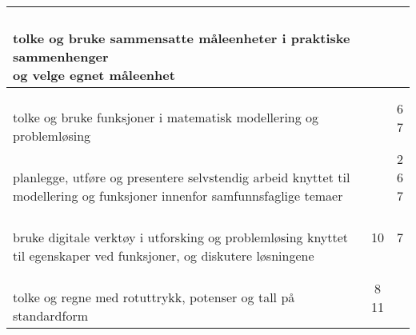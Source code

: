 \documentclass{article}
\begin{document}
\begin{center}
\begin{tabular}{p{10.5cm} | c | c |}
		\shortstack[l]{\\ tolke og bruke sammensatte måleenheter i praktiske sammenhenger\\ og velge egnet måleenhet
		} &\shortstack{} &\shortstack{1} \\ \hline
		
		\shortstack[l]{\\ tolke og bruke funksjoner i matematisk modellering og problemløsing \\\phantom{text}
		} &\shortstack{} &\shortstack{6\\7} \\ \hline
	
		\shortstack[l]{\\planlegge, utføre og presentere selvstendig arbeid knyttet til \\modellering og funksjoner innenfor samfunnsfaglige temaer\\ \phantom{text}
		} &\shortstack{} &\shortstack{2\\6\\7} \\ \hline
		
		
		\shortstack[l]{\\bruke digitale verktøy i utforsking og problemløsing knyttet\\ til egenskaper ved funksjoner, og diskutere løsningene
		} &\shortstack{10\\{}} &\shortstack{7\\{}} \\ \hline
				
		\shortstack[l]{\\tolke og regne med rotuttrykk, potenser og tall på standardform \\ \phantom{a}
		} &\shortstack{8\\11} &\shortstack{} \\ \hline
	\end{tabular}	
\end{center} \vspace{20pt}
\end{document}
